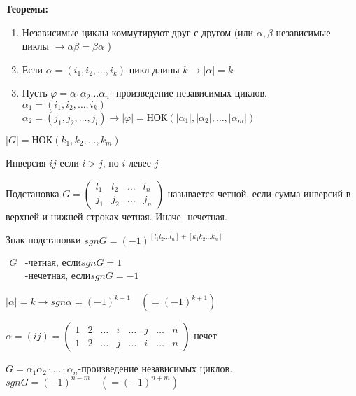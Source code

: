 \documentclass[12pt]{article}
\begin{document}
		\hypertarget{th:while}{\textbf{Теоремы:}}\begin{enumerate}
		
		
			\item Независимые циклы коммутируют друг с другом (или $\alpha ,\beta$-независимые циклы $\rightarrow \alpha\beta=\beta\alpha$ )
			
		
		
			\item Если $\alpha=(i_1,i_2, \dots ,i_k)$-цикл длины $k \rightarrow |\alpha|=k$
		
		
			\item Пусть $\varphi=\alpha_1\alpha_2\dots\alpha_n$- произведение независимых циклов.\\
			$\alpha_1=(i_1,i_2,\dots, i_k)$\\
			$\alpha_2=(j_1,j_2,\dots, j_l) \rightarrow |\varphi|=$НОК$(|\alpha_1|,|\alpha_2|,\dots,|\alpha_m|)$
		
		
		\end{enumerate}
		
		\begin{Th}
			$|G|=\text{НОК}(k_1,k_2, \dots ,k_m)$
		\end{Th}
		
		Инверсия $ij$-если $i>j$, но $i$ левее $j$
		
		Подстановка $G=\begin{pmatrix}
		l_1 & l_2 & \dots & l_n \\
		j_1 & j_2 & \dots & j_n
		\end{pmatrix}$ называется четной, если сумма инверсий в верхней и нижней строках четная. Иначе- нечетная.
		
		Знак подстановки $sgnG=(-1)^{[l_1l_2\dots l_n]+[k_1k_2\dots k_n]}$
		
		$\begin{aligned} 
		G  &\text{-четная, если}  sgnG=1\\
		&\text{-нечетная, если}  sgnG=-1
		\end{aligned}$
		
		$|\alpha|=k\rightarrow sgn\alpha=(-1)^{k-1} \quad (=(-1)^{k+1})$
		
		$\alpha=(ij)=\begin{pmatrix}
		1 & 2 & \dots & i & \dots & j & \dots & n \\
		1 & 2 & \dots & j & \dots & i & \dots & n 
		\end{pmatrix}$-нечет
		
		\begin{Th}
			$G=\alpha_1 \alpha_2 \cdot \dots \cdot \alpha_n$-произведение независимых циклов.\\
			$sgnG=(-1)^{n-m} \quad (=(-1)^{n+m})$
		\end{Th}
		
\end{document}
